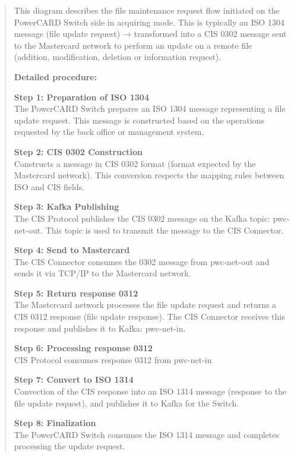 \documentclass[12pt,a4paper]{report}
\begin{document}
\begin{quote}
This diagram describes the file maintenance request flow initiated on
the PowerCARD Switch side in acquiring mode. This is typically an ISO
1304 message (file update request) → transformed into a CIS 0302 message
sent to the Mastercard network to perform an update on a remote file
(addition, modification, deletion or information request).

\textbf{Detailed procedure:}

\textbf{Step 1: Preparation of ISO 1304}\\
The PowerCARD Switch prepares an ISO 1304 message representing a file
update request. This message is constructed based on the operations
requested by the back office or management system.

\textbf{Step 2: CIS 0302 Construction}\\
Constructs a message in CIS 0302 format (format expected by the
Mastercard network). This conversion respects the mapping rules between
ISO and CIS fields.

\textbf{Step 3: Kafka Publishing}\\
The CIS Protocol publishes the CIS 0302 message on the Kafka topic:
pwc-net-out. This topic is used to transmit the message to the CIS
Connector.

\textbf{Step 4: Send to Mastercard}\\
The CIS Connector consumes the 0302 message from pwc-net-out and sends
it via TCP/IP to the Mastercard network.

\textbf{Step 5: Return response 0312}\\
The Mastercard network processes the file update request and returns a
CIS 0312 response (file update response). The CIS Connector receives
this response and publishes it to Kafka: pwc-net-in.

\textbf{Step 6: Processing response 0312}\\
CIS Protocol consumes response 0312 from pwc-net-in

\textbf{Step 7: Convert to ISO 1314}\\
Convection of the CIS response into an ISO 1314 message (response to the
file update request), and publishes it to Kafka for the Switch.

\textbf{Step 8: Finalization}\\
The PowerCARD Switch consumes the ISO 1314 message and completes
processing the update request.
\end{quote}
\end{document}
